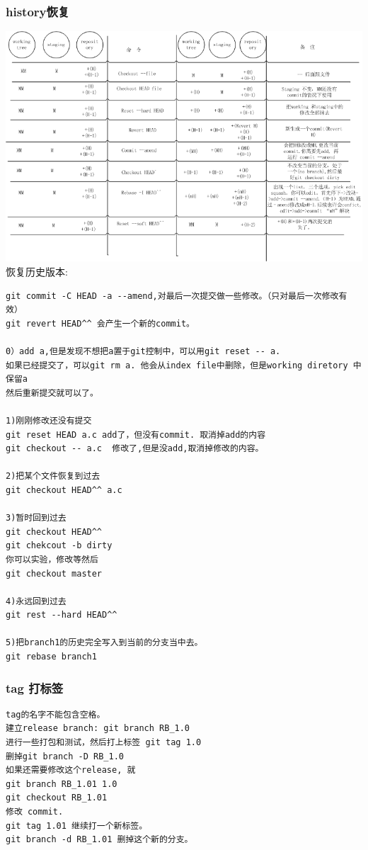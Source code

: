 \documentclass[a4paper,12pt,twoside]{book}
\begin{document}
\begin{CJK*}{UTF8}{song}
\subsubsection{history恢复}
\includegraphics[scale=0.6]{pics/git-history} \\

恢复历史版本: \\
\begin{verbatim}
git commit -C HEAD -a --amend,对最后一次提交做一些修改。（只对最后一次修改有效）
git revert HEAD^^ 会产生一个新的commit。

0）add a,但是发现不想把a置于git控制中，可以用git reset -- a.
如果已经提交了，可以git rm a. 他会从index file中删除，但是working diretory 中保留a
然后重新提交就可以了。

1)刚刚修改还没有提交
git reset HEAD a.c add了，但没有commit. 取消掉add的内容
git checkout -- a.c  修改了,但是没add,取消掉修改的内容。

2)把某个文件恢复到过去
git checkout HEAD^^ a.c

3)暂时回到过去
git checkout HEAD^^
git chekcout -b dirty
你可以实验，修改等然后
git checkout master

4)永远回到过去
git rest --hard HEAD^^

5)把branch1的历史完全写入到当前的分支当中去。
git rebase branch1
\end{verbatim}



\subsubsection{tag 打标签}
\begin{verbatim}
tag的名字不能包含空格。
建立release branch: git branch RB_1.0
进行一些打包和测试，然后打上标签 git tag 1.0
删掉git branch -D RB_1.0
如果还需要修改这个release, 就
git branch RB_1.01 1.0
git checkout RB_1.01
修改 commit.
git tag 1.01 继续打一个新标签。
git branch -d RB_1.01 删掉这个新的分支。


\end{verbatim}
\end{CJK*}
\end{document}
